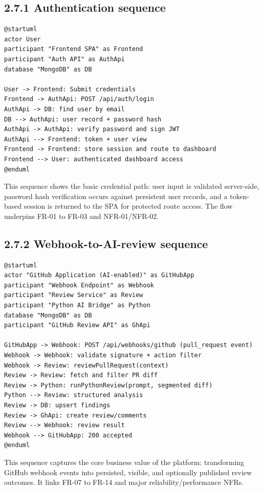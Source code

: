 \subsection{2.7.1 Authentication sequence}

\begin{lstlisting}[caption={Authentication flow (PlantUML source)},label={lst:auth_sequence}]
@startuml
actor User
participant "Frontend SPA" as Frontend
participant "Auth API" as AuthApi
database "MongoDB" as DB

User -> Frontend: Submit credentials
Frontend -> AuthApi: POST /api/auth/login
AuthApi -> DB: find user by email
DB --> AuthApi: user record + password hash
AuthApi -> AuthApi: verify password and sign JWT
AuthApi --> Frontend: token + user view
Frontend -> Frontend: store session and route to dashboard
Frontend --> User: authenticated dashboard access
@enduml
\end{lstlisting}

This sequence shows the basic credential path: user input is validated server-side, password hash verification occurs against persistent user records, and a token-based session is returned to the SPA for protected route access. The flow underpins FR-01 to FR-03 and NFR-01/NFR-02.

\subsection{2.7.2 Webhook-to-AI-review sequence}

\begin{lstlisting}[caption={Webhook-to-AI-review flow (PlantUML source)},label={lst:webhook_sequence}]
@startuml
actor "GitHub Application (AI-enabled)" as GitHubApp
participant "Webhook Endpoint" as Webhook
participant "Review Service" as Review
participant "Python AI Bridge" as Python
database "MongoDB" as DB
participant "GitHub Review API" as GhApi

GitHubApp -> Webhook: POST /api/webhooks/github (pull_request event)
Webhook -> Webhook: validate signature + action filter
Webhook -> Review: reviewPullRequest(context)
Review -> Review: fetch and filter PR diff
Review -> Python: runPythonReview(prompt, segmented diff)
Python --> Review: structured analysis
Review -> DB: upsert findings
Review -> GhApi: create review/comments
Review --> Webhook: review result
Webhook --> GitHubApp: 200 accepted
@enduml
\end{lstlisting}

This sequence captures the core business value of the platform: transforming GitHub webhook events into persisted, visible, and optionally published review outcomes. It links FR-07 to FR-14 and major reliability/performance NFRs.

